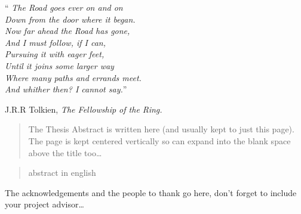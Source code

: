 \documentclass[
12pt, %
oneside, %
english, brazil, %
doublespacing,
nolistspacing, %
liststotoc, %
]{MastersDoctoralThesis} %
\begin{document}
\vspace*{0.2\textheight}
\begin{center}
\noindent\enquote{\itshape
    The Road goes ever on and on \\ 
    		Down from the door where it began. \\
    Now far ahead the Road has gone, \\
    		And I must follow, if I can, \\
    Pursuing it with eager feet, \\
    		Until it joins some larger way \\
    Where many paths and errands meet. \\
    		And whither then? I cannot say.}\bigbreak

 J.R.R Tolkien, \textit{The Fellowship of the Ring.}
\end{center}
\cleardoublepage

\begin{abstract}
\addchaptertocentry{\abstractname} %

The Thesis Abstract is written here (and usually kept to just this page). The page is kept centered vertically so can expand into the blank space above the title too\ldots

\end{abstract}

\begin{abstract}
\addchaptertocentry{\abstractname}
abstract in english
\end{abstract}


\begin{acknowledgements}
\addchaptertocentry{\acknowledgementname} %

The acknowledgements and the people to thank go here, don't forget to include your project advisor\ldots

\end{acknowledgements}

\end{document}
